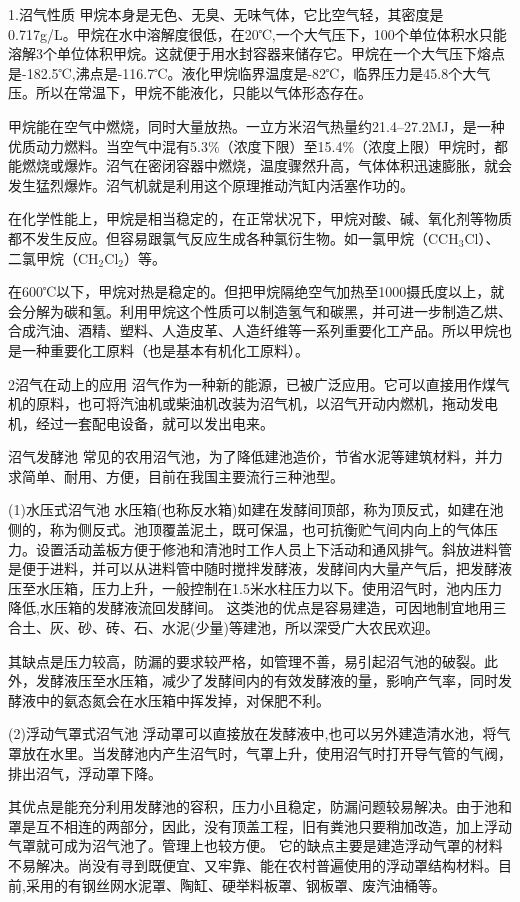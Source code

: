 \documentclass{ctexbook}
\begin{document}
1.沼气性质
甲烷本身是无色、无臭、无味气体，它比空气轻，其密度是0.717g/L。甲烷在水中溶解度很低，在20℃,一个大气压下，100个单位体积水只能溶解3个单位体积甲烷。这就便于用水封容器来储存它。甲烷在一个大气压下熔点是-182.5℃,沸点是-116.7℃。液化甲烷临界温度是-82℃，临界压力是45.8个大气压。所以在常温下，甲烷不能液化，只能以气体形态存在。

甲烷能在空气中燃烧，同时大量放热。一立方米沼气热量约21.4--27.2MJ，是一种优质动力燃料。当空气中混有5.3\%（浓度下限）至15.4\%（浓度上限）甲烷时，都能燃烧或爆炸。沼气在密闭容器中燃烧，温度骤然升高，气体体积迅速膨胀，就会发生猛烈爆炸。沼气机就是利用这个原理推动汽缸内活塞作功的。

在化学性能上，甲烷是相当稳定的，在正常状况下，甲烷对酸、碱、氧化剂等物质都不发生反应。但容易跟氯气反应生成各种氯衍生物。如一氯甲烷（CCH$_3$Cl）、二氯甲烷（CH$_2$Cl$_2$）等。

在600℃以下，甲烷对热是稳定的。但把甲烷隔绝空气加热至1000摄氏度以上，就会分解为碳和氢。利用甲烷这个性质可以制造氢气和碳黑，并可进一步制造乙烘、合成汽油、酒精、塑料、人造皮革、人造纤维等一系列重要化工产品。所以甲烷也是一种重要化工原料（也是基本有机化工原料）。

2沼气在动上的应用
沼气作为一种新的能源，已被广泛应用。它可以直接用作煤气机的原料，也可将汽油机或柴油机改装为沼气机，以沼气开动内燃机，拖动发电机，经过一套配电设备，就可以发出电来。

沼气发酵池
常见的农用沼气池，为了降低建池造价，节省水泥等建筑材料，并力求简单、耐用、方便，目前在我国主要流行三种池型。

(1)水压式沼气池
水压箱(也称反水箱)如建在发酵间顶部，称为顶反式，如建在池侧的，称为侧反式。池顶覆盖泥土，既可保温，也可抗衡贮气间内向上的气体压力。设置活动盖板方便于修池和清池时工作人员上下活动和通风排气。斜放进料管是便于进料，并可以从进料管中随时搅拌发酵液，发酵间内大量产气后，把发酵液压至水压箱，压力上升，一般控制在1.5米水柱压力以下。使用沼气时，池内压力降低,水压箱的发酵液流回发酵间。
这类池的优点是容易建造，可因地制宜地用三合土、灰、砂、砖、石、水泥(少量)等建池，所以深受广大农民欢迎。

其缺点是压力较高，防漏的要求较严格，如管理不善，易引起沼气池的破裂。此外，发酵液压至水压箱，减少了发酵间内的有效发酵液的量，影响产气率，同时发酵液中的氨态氮会在水压箱中挥发掉，对保肥不利。

(2)浮动气罩式沼气池
浮动罩可以直接放在发酵液中,也可以另外建造清水池，将气罩放在水里。当发酵池内产生沼气时，气罩上升，使用沼气时打开导气管的气阀，排出沼气，浮动罩下降。

其优点是能充分利用发酵池的容积，压力小且稳定，防漏问题较易解决。由于池和罩是互不相连的两部分，因此，没有顶盖工程，旧有粪池只要稍加改造，加上浮动气罩就可成为沼气池了。管理上也较方便。
它的缺点主要是建造浮动气罩的材料不易解决。尚没有寻到既便宜、又牢靠、能在农村普遍使用的浮动罩结构材料。目前,采用的有钢丝网水泥罩、陶缸、硬举料板罩、钢板罩、废汽油桶等。
\end{document}
